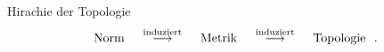 \documentclass[class=article, crop=false]{standalone}
\begin{document}
\begin{zettel}{Hirachie der Topologie}
\[
        \tx{ Norm } \stackrel{\tx{ induziert } }{\longrightarrow} \tx{ Metrik }  \stackrel{\tx{ induziert } }{\longrightarrow} \tx{ Topologie }\\
.\]

\end{zettel}
\end{document}
